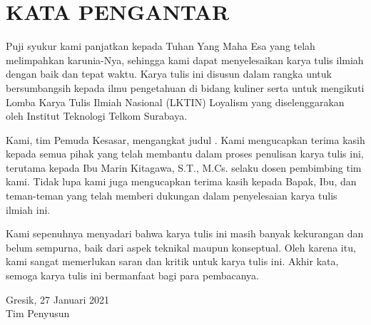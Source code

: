 \section*{\centering KATA PENGANTAR}

Puji syukur kami panjatkan kepada Tuhan Yang Maha Esa yang telah melimpahkan karunia-Nya, sehingga kami dapat menyelesaikan karya tulis ilmiah dengan baik dan tepat waktu. Karya tulis ini disusun dalam rangka untuk bersumbangsih kepada ilmu pengetahuan di bidang kuliner serta untuk mengikuti Lomba Karya Tulis Ilmiah Nasional (LKTIN) Loyalism yang diselenggarakan oleh Institut Teknologi Telkom Surabaya.

\vspace*{.2cm}

Kami, tim Pemuda Kesasar, mengangkat judul \textbf{}. Kami mengucapkan terima kasih kepada semua pihak yang telah membantu dalam proses penulisan karya tulis ini, terutama kepada Ibu Marin Kitagawa, S.T., M.Cs. selaku dosen pembimbing tim kami. Tidak lupa kami juga mengucapkan terima kasih kepada Bapak, Ibu, dan teman-teman yang telah memberi dukungan dalam penyelesaian karya tulis ilmiah ini.

\vspace*{.2cm}

Kami sepenuhnya menyadari bahwa karya tulis ini masih banyak kekurangan dan belum sempurna, baik dari aspek teknikal maupun konseptual. 
Oleh karena itu, kami sangat memerlukan saran dan kritik untuk karya tulis ini. Akhir kata, semoga karya tulis ini bermanfaat bagi para pembacanya.

\begin{flushright}
    Gresik, 27 Januari 2021\\
    Tim Penyusun
\end{flushright}